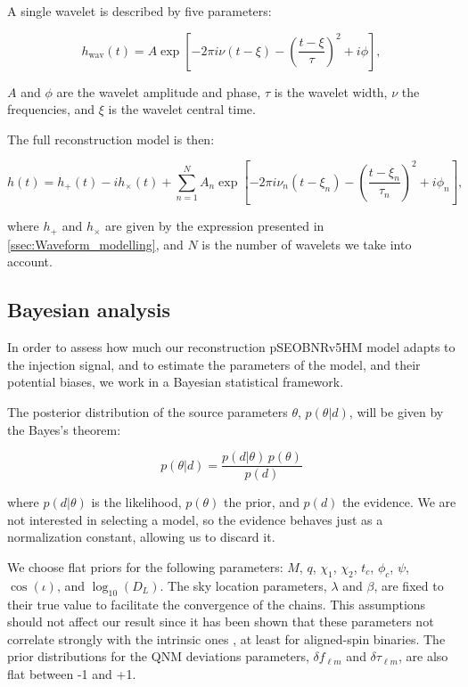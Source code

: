 A single wavelet is described by five parameters:

\begin{equation}
	h_{\text{wav}}(t) = A \exp \left[ - 2\pi i \nu (t - \xi) - \left( \frac{t - \xi}{\tau} \right)^2 + i \phi \right],
\end{equation}

\noindent 
$A$ and $\phi$ are the wavelet amplitude and phase, $\tau$ is the wavelet width, $\nu$ the frequencies, and $\xi$ is the wavelet central time.

The full reconstruction model is then:

\begin{equation}
	h(t) = h_+(t) - i h_\times(t)+ \sum_{n=1}^{N} A_n \exp \left[ 
- 2\pi i \nu_n (t - \xi_n) - \left( \frac{t - \xi_n}{\tau_n} \right)^2 + i \phi_n \right],
\label{eq:full_model}
\end{equation}

\noindent
where $h_+$ and $ h_\times$ are given by the expression presented in \ref{ssec:Waveform_modelling}, and $N$ is the number of wavelets we take into account.


\subsection{Bayesian analysis}
\label{Bayesian_Analysis}


In order to assess how much our reconstruction pSEOBNRv5HM model adapts to the injection signal, and to estimate the parameters of the model, and their potential biases, we work in a Bayesian statistical framework.

The posterior distribution of the source parameters $\theta$, $p(\theta | d)$, will be given by the Bayes's theorem:

\begin{equation}
	p(\theta | d) = \frac{p(d | \theta) \, p(\theta)}{p(d)}
\end{equation}

\noindent 
where $p(d | \theta)$ is the likelihood, $p(\theta)$ the prior, and $p(d)$ the evidence. We are not interested in selecting a model, so the evidence behaves just as a normalization constant, allowing us to discard it. 

We choose flat priors for the following parameters: $M$, $q$, $\chi_1$, $\chi_2$, $t_c$, $\phi_c$, $\psi$, $\cos(\iota)$, and $\log_{10}(D_L)$. The sky location parameters, $\lambda$ and $\beta$, are fixed to their true value to facilitate the convergence of the chains. This assumptions should not affect our result since it has been shown that these parameters not correlate strongly with the intrinsic ones \cite{Marsat_2021}, at least for aligned-spin binaries. The prior distributions for the QNM deviations parameters, $\delta f_{\ell m}$ and $\delta \tau_{\ell m}$, are also flat between -1 and +1. 

